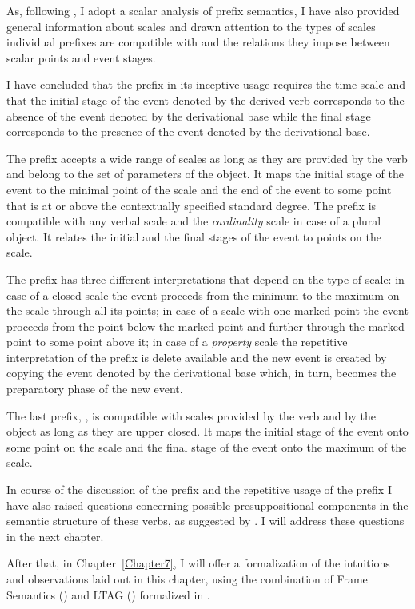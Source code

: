 As, following \citet{Kagan:book}, I adopt a scalar analysis of prefix semantics, I have also provided general information about scales and drawn attention to the types of scales individual prefixes are compatible with and the relations they impose between scalar points and event stages. 

I have concluded that the prefix  in its inceptive usage requires the time scale and that the initial stage of the event denoted by the derived verb corresponds to the absence of the event denoted by the derivational base while the final stage corresponds to the presence of the event denoted by the derivational base. 

The prefix  accepts a wide range of scales as long as they are provided by the verb and belong to the set of parameters of the object. It maps the initial stage of the event to the minimal point of the scale and the end of the event to some point that is at or above the contextually specified standard degree. The prefix  is compatible with any verbal scale and the \textit{cardinality} scale in case of a plural object. It relates the initial and the final stages of the event to points on the scale. 

The prefix  has three different interpretations that depend on the type of scale: in case of a closed scale the event proceeds from the minimum to the maximum on the scale through all its points; in case of a scale with one marked point the event proceeds from the point below the marked point and further through the marked point to some point above it; in case of a \textit{property} scale the repetitive interpretation of the prefix is delete available and the new event is created by copying the event denoted by the derivational base which, in turn, becomes the preparatory phase of the new event. 

The last prefix, , is compatible with scales provided by the verb and by the object as long as they are upper closed. It maps the initial stage of the event onto some point on the scale and the final stage of the event onto the maximum of the scale. 

In course of the discussion of the prefix  and the repetitive usage of the prefix  I have also raised questions concerning possible presuppositional components in the semantic structure of these verbs, as suggested by \citet{Kagan:book}. I will address these questions in the next chapter.

After that, in Chapter~\ref{Chapter7}, I will offer a formalization of the intuitions and observations laid out in this chapter, using the combination of Frame Semantics (\citealt{Fillmore:82}) and LTAG (\citealt{JoshiSchabes:97}) formalized in \citealt{KallmeyerOsswald:13}. 

